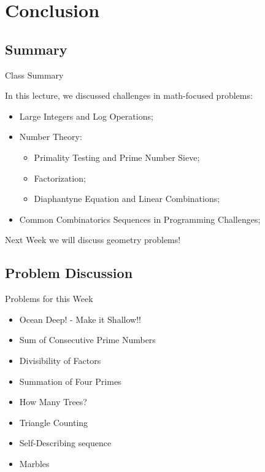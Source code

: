 \section{Conclusion}

\subsection{Summary}
\begin{frame}{Class Summary}

In this lecture, we discussed challenges in math-focused problems:

\begin{itemize}
  \item Large Integers and Log Operations;
  \item Number Theory:
  \begin{itemize}
    \item Primality Testing and Prime Number Sieve;
    \item Factorization;
    \item Diaphantyne Equation and Linear Combinations;
  \end{itemize}
  \item Common Combinatorics Sequences in Programming Challenges;
\end{itemize}
\bigskip

Next Week we will discuss geometry problems!
\end{frame}

\subsection{Problem Discussion}
\begin{frame}{Problems for this Week}
  \begin{itemize}
    \item Ocean Deep! - Make it Shallow!!
    \item Sum of Consecutive Prime Numbers
    \item Divisibility of Factors
    \item Summation of Four Primes
    \item How Many Trees?
    \item Triangle Counting
    \item Self-Describing sequence
    \item Marbles
  \end{itemize}
\end{frame}

